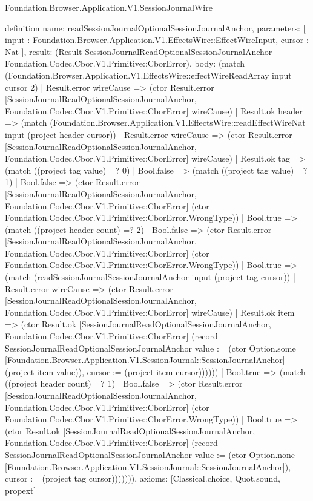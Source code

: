 \begin{lexlean}{Foundation.Browser.Application.V1.SessionJournalWire}
\begin{semanticmodule}
definition{
  name: readSessionJournalOptionalSessionJournalAnchor,
  parameters: [
    input : Foundation.Browser.Application.V1.EffectsWire::EffectWireInput,
    cursor : Nat
  ],
  result: (Result SessionJournalReadOptionalSessionJournalAnchor Foundation.Codec.Cbor.V1.Primitive::CborError),
  body: (match (Foundation.Browser.Application.V1.EffectsWire::effectWireReadArray input cursor 2)
    | Result.error wireCause => (ctor Result.error [SessionJournalReadOptionalSessionJournalAnchor, Foundation.Codec.Cbor.V1.Primitive::CborError] wireCause)
    | Result.ok header => (match (Foundation.Browser.Application.V1.EffectsWire::readEffectWireNat input (project header cursor))
      | Result.error wireCause => (ctor Result.error [SessionJournalReadOptionalSessionJournalAnchor, Foundation.Codec.Cbor.V1.Primitive::CborError] wireCause)
      | Result.ok tag => (match ((project tag value) =? 0)
        | Bool.false => (match ((project tag value) =? 1)
          | Bool.false => (ctor Result.error [SessionJournalReadOptionalSessionJournalAnchor, Foundation.Codec.Cbor.V1.Primitive::CborError] (ctor Foundation.Codec.Cbor.V1.Primitive::CborError.WrongType))
          | Bool.true => (match ((project header count) =? 2)
            | Bool.false => (ctor Result.error [SessionJournalReadOptionalSessionJournalAnchor, Foundation.Codec.Cbor.V1.Primitive::CborError] (ctor Foundation.Codec.Cbor.V1.Primitive::CborError.WrongType))
            | Bool.true => (match (readSessionJournalSessionJournalAnchor input (project tag cursor))
              | Result.error wireCause => (ctor Result.error [SessionJournalReadOptionalSessionJournalAnchor, Foundation.Codec.Cbor.V1.Primitive::CborError] wireCause)
              | Result.ok item => (ctor Result.ok [SessionJournalReadOptionalSessionJournalAnchor, Foundation.Codec.Cbor.V1.Primitive::CborError] (record SessionJournalReadOptionalSessionJournalAnchor {value := (ctor Option.some [Foundation.Browser.Application.V1.SessionJournal::SessionJournalAnchor] (project item value)), cursor := (project item cursor)})))))
        | Bool.true => (match ((project header count) =? 1)
          | Bool.false => (ctor Result.error [SessionJournalReadOptionalSessionJournalAnchor, Foundation.Codec.Cbor.V1.Primitive::CborError] (ctor Foundation.Codec.Cbor.V1.Primitive::CborError.WrongType))
          | Bool.true => (ctor Result.ok [SessionJournalReadOptionalSessionJournalAnchor, Foundation.Codec.Cbor.V1.Primitive::CborError] (record SessionJournalReadOptionalSessionJournalAnchor {value := (ctor Option.none [Foundation.Browser.Application.V1.SessionJournal::SessionJournalAnchor]), cursor := (project tag cursor)})))))),
  axioms: [Classical.choice, Quot.sound, propext]
}


\end{semanticmodule}
\end{lexlean}
